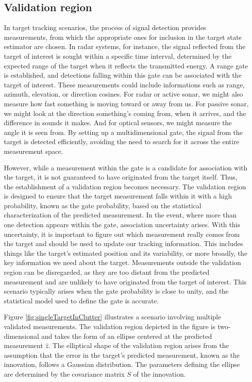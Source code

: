 \subsection{Validation region}
\label{sec:validation_region}
In target tracking scenarios, the process of signal detection provides measurements, from which the appropriate ones
for inclusion in the target state estimator are chosen. In radar systems, for instance, the signal reflected from the
target of interest is sought within a specific time interval, determined by the expected range of the target when it
reflects the transmitted energy. A range gate is established, and detections falling within this gate can be
associated with the target of interest. These measurements could include informations such as range, azimuth, elevation,
or direction cosines. For radar or active sonar, we might also measure how fast something is moving toward or away
from us. For passive sonar, we might look at the direction something's coming from, when it arrives, and the
difference in sounds it makes. And for optical sensors, we might measure the angle it is seen from. By setting up a
multidimensional gate, the signal from the target is detected efficiently, avoiding the need to search for it across the entire measurement space.

However, while a measurement within the gate is a candidate for association with the target, it is not guaranteed to
have originated from the target itself. Thus, the establishment of a validation region becomes necessary. The
validation region is designed to ensure that the target measurement falls within it with a high probability, known as
the gate probability, based on the statistical characterization of the predicted measurement. In the event, where more
than one detection appears within the gate, association uncertainty arises. With this uncertainty, it is important to
figure out which measurement really comes from the target and should be used to update our tracking information. This includes things like the target's estimated position and its variability, or more broadly, the key information we need about the target. Measurements outside the validation region can be disregarded, as they are too distant from the predicted measurement and are unlikely to have originated from the target of interest. This scenario typically arises when the gate probability is close to unity, and the statistical model used to define the gate is accurate.

Figure \ref{fig:singleTargetInClutter} illustrates a scenario involving multiple validated measurements. The validation region depicted in the
figure is two-dimensional and takes the form of an ellipse centered at the predicted measurement $\hat{z}$. The
elliptical shape of the validation region arises from the assumption that the error in the target's predicted
measurement, known as the innovation, follows a Gaussian distribution. The parameters defining the ellipse are
determined by the covariance matrix $S$ of the innovation.

